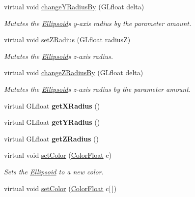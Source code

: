 \begin{DoxyCompactItemize}
virtual void \hyperlink{classtsgl_1_1_ellipsoid_a84f0a1161d9047e5661de030ed924d38}{change\+Y\+Radius\+By} (G\+Lfloat delta)
\begin{DoxyCompactList}\small\item\em Mutates the \hyperlink{classtsgl_1_1_ellipsoid}{Ellipsoid}\textquotesingle{}s y-\/axis radius by the parameter amount. \end{DoxyCompactList}\item 
virtual void \hyperlink{classtsgl_1_1_ellipsoid_a6663042d8935a658b8a27a5843d897e8}{set\+Z\+Radius} (G\+Lfloat radiusZ)
\begin{DoxyCompactList}\small\item\em Mutates the \hyperlink{classtsgl_1_1_ellipsoid}{Ellipsoid}\textquotesingle{}s z-\/axis radius. \end{DoxyCompactList}\item 
virtual void \hyperlink{classtsgl_1_1_ellipsoid_a1e749caabe1c994404027c9d78098356}{change\+Z\+Radius\+By} (G\+Lfloat delta)
\begin{DoxyCompactList}\small\item\em Mutates the \hyperlink{classtsgl_1_1_ellipsoid}{Ellipsoid}\textquotesingle{}s z-\/axis radius by the parameter amount. \end{DoxyCompactList}\item 
\mbox{\label{classtsgl_1_1_ellipsoid_a8231ebee8fb2b791679dc1ffae36f238}} 
virtual G\+Lfloat {\bfseries get\+X\+Radius} ()
\item 
\mbox{\label{classtsgl_1_1_ellipsoid_a0f0537cbd8feb6b68d60ddc3a08ec75d}} 
virtual G\+Lfloat {\bfseries get\+Y\+Radius} ()
\item 
\mbox{\label{classtsgl_1_1_ellipsoid_aff43989fc02b3a833014ee426778752b}} 
virtual G\+Lfloat {\bfseries get\+Z\+Radius} ()
\item 
virtual void \hyperlink{classtsgl_1_1_ellipsoid_afc2fc98057e5d19d8fa0c45f07273cdb}{set\+Color} (\hyperlink{structtsgl_1_1_color_float}{Color\+Float} c)
\begin{DoxyCompactList}\small\item\em Sets the \hyperlink{classtsgl_1_1_ellipsoid}{Ellipsoid} to a new color. \end{DoxyCompactList}\item 
virtual void \hyperlink{classtsgl_1_1_ellipsoid_ab8e15e879521e4c96be8192258cad26e}{set\+Color} (\hyperlink{structtsgl_1_1_color_float}{Color\+Float} c\mbox{[}$\,$\mbox{]})

\end{DoxyCompactItemize}
